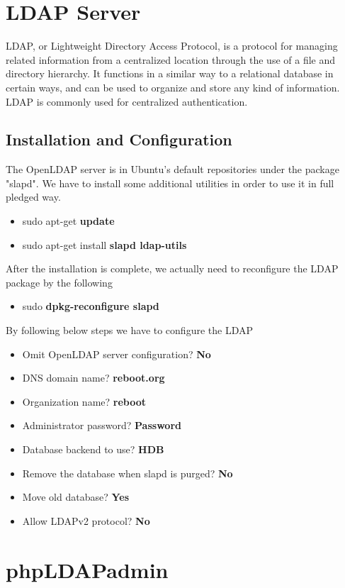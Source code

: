 \documentclass[12pt]{report}
\begin{document}
\section{LDAP Server}

	LDAP, or Lightweight Directory Access Protocol, is a protocol for managing related information from a centralized location through the use of a file and directory hierarchy. It functions in a similar way to a relational database in certain ways, and can be used to organize and store any kind of information. LDAP is commonly used for centralized authentication.

\subsection{Installation and Configuration}
	The OpenLDAP server is in Ubuntu's default repositories under the package "slapd". We have to install some additional utilities in order to use it in full pledged way.
	
	\begin{itemize}
	\item sudo apt-get \textbf{update}
	\item sudo apt-get install \textbf{slapd ldap-utils}
	\end{itemize}

	After the installation is complete, we actually need to reconfigure the LDAP package by the following
	\begin{itemize}
	\item sudo \textbf{dpkg-reconfigure slapd}
	\end{itemize}
	
	\pagebreak
		By following below steps we have to configure the LDAP
	\begin{itemize}
		\item Omit OpenLDAP server configuration? \textbf{No}
		\item DNS domain name? \textbf{reboot.org}
		\item Organization name? \textbf{reboot}
		\item Administrator password? \textbf{Password}
		\item Database backend to use? \textbf{HDB}
		\item Remove the database when slapd is purged? \textbf{No}
		\item Move old database? \textbf{Yes}
		\item Allow LDAPv2 protocol? \textbf{No}
	\end{itemize}
\section{phpLDAPadmin}	
	
\end{document}

